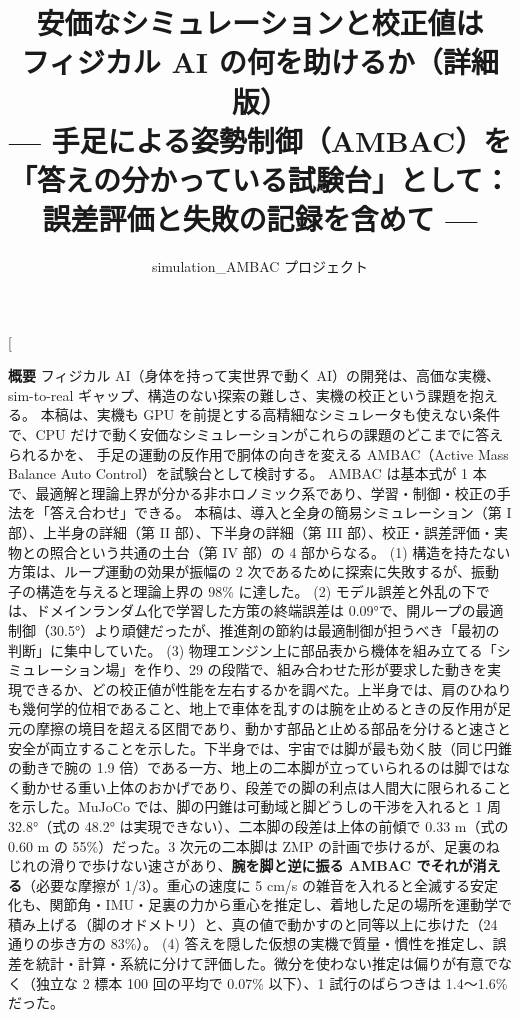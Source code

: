 \documentclass[paper=a4paper,fontsize=10pt,twocolumn,column_gap=2zw,line_length=24zw,number_of_lines=46,head_space=20mm]{jlreq}
\title{\textbf{安価なシミュレーションと校正値は\\フィジカル AI の何を助けるか（詳細版）}\\[0.3em]
\large --- 手足による姿勢制御（AMBAC）を「答えの分かっている試験台」として：\\誤差評価と失敗の記録を含めて ---}
\author{simulation\_AMBAC プロジェクト}
\date{\fpversion}
\begin{document}
\twocolumn[
\begin{@twocolumnfalse}
\maketitle
\vspace{-1.5em}
\begin{center}\begin{minipage}{0.9\textwidth}\small
\textbf{概要}\quad
フィジカル AI（身体を持って実世界で動く AI）の開発は、高価な実機、sim-to-real ギャップ、構造のない探索の難しさ、実機の校正という課題を抱える。
本稿は、実機も GPU を前提とする高精細なシミュレータも使えない条件で、CPU だけで動く安価なシミュレーションがこれらの課題のどこまでに答えられるかを、
手足の運動の反作用で胴体の向きを変える AMBAC（Active Mass Balance Auto Control）を試験台として検討する。
AMBAC は基本式が 1 本で、最適解と理論上界が分かる非ホロノミック系であり、学習・制御・校正の手法を「答え合わせ」できる。
本稿は、導入と全身の簡易シミュレーション（第 I 部）、上半身の詳細（第 II 部）、下半身の詳細（第 III 部）、校正・誤差評価・実物との照合という共通の土台（第 IV 部）の 4 部からなる。
(1) 構造を持たない方策は、ループ運動の効果が振幅の 2 次であるために探索に失敗するが、振動子の構造を与えると理論上界の 98\% に達した。
(2) モデル誤差と外乱の下では、ドメインランダム化で学習した方策の終端誤差は 0.09°で、開ループの最適制御（30.5°）より頑健だったが、推進剤の節約は最適制御が担うべき「最初の判断」に集中していた。
(3) 物理エンジン上に部品表から機体を組み立てる「シミュレーション場」を作り、29 の段階で、組み合わせた形が要求した動きを実現できるか、どの校正値が性能を左右するかを調べた。上半身では、肩のひねりも幾何学的位相であること、地上で車体を乱すのは腕を止めるときの反作用が足元の摩擦の境目を超える区間であり、動かす部品と止める部品を分けると速さと安全が両立することを示した。下半身では、宇宙では脚が最も効く肢（同じ円錐の動きで腕の 1.9 倍）である一方、地上の二本脚が立っていられるのは脚ではなく動かせる重い上体のおかげであり、段差での脚の利点は人間大に限られることを示した。MuJoCo では、脚の円錐は可動域と脚どうしの干渉を入れると 1 周 32.8°（式の 48.2° は実現できない）、二本脚の段差は上体の前傾で 0.33 m（式の 0.60 m の 55\%）だった。3 次元の二本脚は ZMP の計画で歩けるが、足裏のねじれの滑りで歩けない速さがあり、\textbf{腕を脚と逆に振る AMBAC でそれが消える}（必要な摩擦が 1/3）。重心の速度に 5 cm/s の雑音を入れると全滅する安定化も、関節角・IMU・足裏の力から重心を推定し、着地した足の場所を運動学で積み上げる（脚のオドメトリ）と、真の値で動かすのと同等以上に歩けた（24 通りの歩き方の 83\%）。
(4) 答えを隠した仮想の実機で質量・慣性を推定し、誤差を統計・計算・系統に分けて評価した。微分を使わない推定は偏りが有意でなく（独立な 2 標本 100 回の平均で 0.07\% 以下）、1 試行のばらつきは 1.4〜1.6\% だった。

\end{minipage}
\end{center}
\end{@twocolumnfalse}
\end{document}
